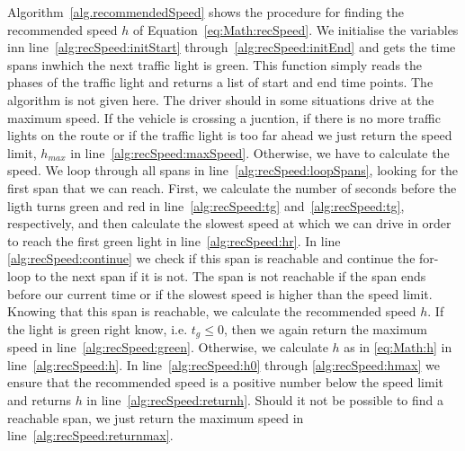 Algorithm~\ref{alg.recommendedSpeed} shows the procedure for finding the recommended speed $h$ of Equation~\ref{eq:Math:recSpeed}.
We initialise the variables inn line~\ref{alg:recSpeed:initStart} through~\ref{alg:recSpeed:initEnd} and gets the time spans inwhich the next traffic light is green. 
This function simply reads the phases of the traffic light and returns a list of start and end time points. 
The algorithm is not given here.
The driver should in some situations drive at the maximum speed. If the vehicle is crossing a jucntion, if there is no more traffic lights on the route or if the traffic light is too far ahead we just return the speed limit, $h_{max}$ in line~\ref{alg:recSpeed:maxSpeed}.
Otherwise, we have to calculate the speed. 
We loop through all spans in line~\ref{alg:recSpeed:loopSpans}, looking for the first span that we can reach.
First, we calculate the number of seconds before the ligth turns green and red in line~\ref{alg:recSpeed:tg} and~\ref{alg:recSpeed:tg}, respectively, and then calculate the slowest speed at which we can drive in order to reach the first green light in line~\ref{alg:recSpeed:hr}.
In line \ref{alg:recSpeed:continue} we check if this span is reachable and continue the for-loop to the next span if it is not. 
The span is not reachable if the span ends before our current time or if the slowest speed is higher than the speed limit.
Knowing that this span is reachable, we calculate the recommended speed $h$.
If the light is green right know, i.e. $t_g \leq 0$, then we again return the maximum speed in line~\ref{alg:recSpeed:green}. Otherwise, we calculate $h$ as in \eqref{eq:Math:h} in line~\ref{alg:recSpeed:h}.
In line~\ref{alg:recSpeed:h0} through \ref{alg:recSpeed:hmax} we ensure that the recommended speed is a positive number below the speed limit and returns $h$ in line~\ref{alg:recSpeed:returnh}.
Should it not be possible to find a reachable span, we just return the maximum speed in line~\ref{alg:recSpeed:returnmax}.

